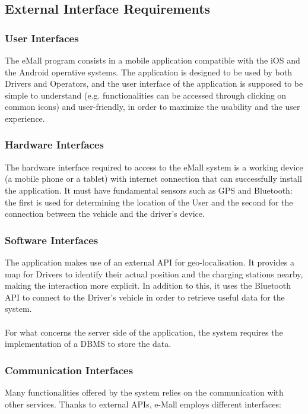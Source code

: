 \documentclass[../main.tex]{subfiles}
\begin{document}

\subsection{External Interface Requirements}

\subsubsection{User Interfaces}
The eMall program consists in a mobile application compatible with the iOS and the Android operative systems. The application is designed to be used by both Drivers and Operators, and the user interface of the application is supposed to be simple to understand (e.g. functionalities can be accessed through clicking on common icons) and user-friendly, in order to maximize the usability and the user experience.

\subsubsection{Hardware Interfaces}
The hardware interface required to access to the eMall system is a working device (a mobile phone or a tablet) with internet connection that can successfully install the application. It must have fundamental sensors such as GPS and Bluetooth: the first is used for determining the location of the User and the second for the connection between the vehicle and the driver’s device.

\subsubsection{Software Interfaces}
The application makes use of an external API for geo-localisation. It provides a map for Drivers to identify their actual position and the charging stations nearby, making the interaction more explicit. In addition to this, it uses the Bluetooth API to connect to the Driver's vehicle in order to retrieve useful data for the system. 
\\
\\
For what concerns the server side of the application, the system requires the implementation of a DBMS to store the data.

\subsubsection{Communication Interfaces}
Many functionalities offered by the system relies on the communication with other services. Thanks to external APIs, e-Mall employs different interfaces: 
\end{document}
